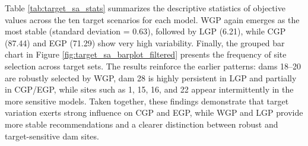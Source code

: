 Table \ref{tab:target_sa_stats} summarizes the descriptive statistics of objective values across the ten target scenarios for each model. WGP again emerges as the most stable (standard deviation = 0.63), followed by LGP (6.21), while CGP (87.44) and EGP (71.29) show very high variability. Finally, the grouped bar chart in Figure \ref{fig:target_sa_barplot_filtered} presents the frequency of site selection across target sets. The results reinforce the earlier patterns: dams 18–20 are robustly selected by WGP, dam 28 is highly persistent in LGP and partially in CGP/EGP, while sites such as 1, 15, 16, and 22 appear intermittently in the more sensitive models. Taken together, these findings demonstrate that target variation exerts strong influence on CGP and EGP, while WGP and LGP provide more stable recommendations and a clearer distinction between robust and target-sensitive dam sites.

        









